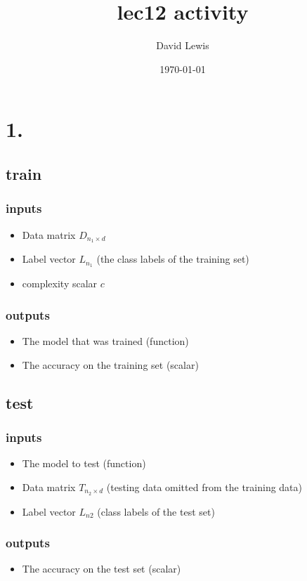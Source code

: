\documentclass[11pt]{article}
\author{David Lewis}
\date{\today}
\title{lec12 activity}
\begin{document}
\maketitle
\section*{1.}
\label{sec:org4e80a23}
\subsection*{train}
\label{sec:org6143ea8}
\subsubsection*{inputs}
\label{sec:org8907a52}
\begin{itemize}
\item Data matrix \(D_{n_1 \times d}\)
\item Label vector \(L_{n_1}\) (the class labels of the training set)
\item complexity scalar \(c\)
\end{itemize}
\subsubsection*{outputs}
\label{sec:org8c9259d}
\begin{itemize}
\item The model that was trained (function)
\item The accuracy on the training set (scalar)
\end{itemize}
\subsection*{test}
\label{sec:org1c374cc}
\subsubsection*{inputs}
\label{sec:org200299e}
\begin{itemize}
\item The model to test (function)
\item Data matrix \(T_{n_2 \times d}\) (testing data omitted from the training data)
\item Label vector \(L_{n2}\) (class labels of the test set)
\end{itemize}
\subsubsection*{outputs}
\label{sec:orgb54c545}
\begin{itemize}
\item The accuracy on the test set (scalar)
\end{itemize}
\end{document}
